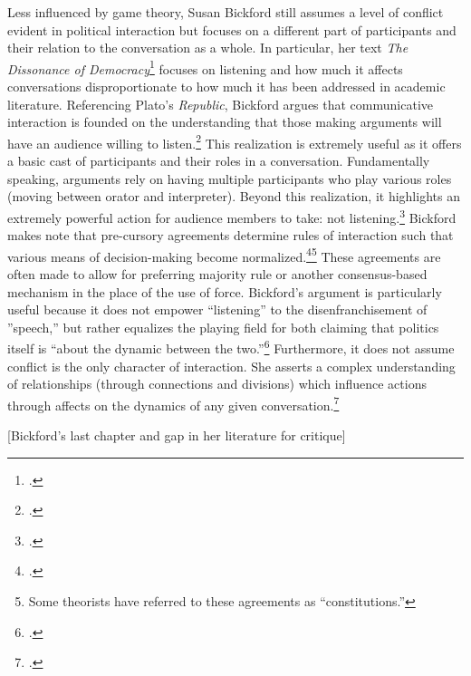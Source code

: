 \documentclass{article}
\begin{document}
Less influenced by game theory, Susan Bickford still assumes a level of conflict evident in political interaction but focuses on a different part of participants and their relation to the conversation as a whole.
In particular, her text \emph{The Dissonance of Democracy}\footcite{bickford96} focuses on listening and how much it affects conversations disproportionate to how much it has been addressed in academic literature. 
Referencing Plato's \emph{Republic}, Bickford argues that communicative interaction is founded on the understanding that those making arguments will have an audience willing to listen.\footcite[3]{bickford96}
This realization is extremely useful as it offers a basic cast of participants and their roles in a conversation.
Fundamentally speaking, arguments rely on having multiple participants who play various roles (moving between orator and interpreter).
Beyond this realization, it highlights an extremely powerful action for audience members to take: not listening.\footcite[3]{bickford96}
Bickford makes note that pre-cursory agreements determine rules of interaction such that various means of decision-making become normalized.\footcite[3--5]{bickford96}\footnote{Some theorists have referred to these agreements as ``constitutions.''}
These agreements are often made to allow for preferring majority rule or another consensus-based mechanism in the place of the use of force.
Bickford's argument is particularly useful because it does not empower ``listening'' to the disenfranchisement of ''speech,'' but rather equalizes the playing field for both claiming that politics itself is ``about the dynamic between the two.''\footcite[4]{bickford96}
Furthermore, it does not assume conflict is the only character of interaction.
She asserts a complex understanding of relationships (through connections and divisions) which influence actions through affects on the dynamics of any given conversation.\footcite[9--11]{bickford96}

[Bickford's last chapter and gap in her literature for critique]
\end{document}
